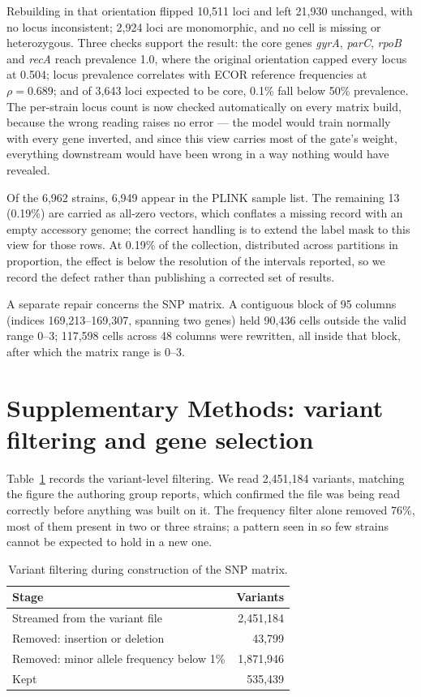 \documentclass[11pt]{article}
\begin{document}
Rebuilding in that orientation flipped 10,511 loci and left 21,930 unchanged, with no locus
inconsistent; 2,924 loci are monomorphic, and no cell is missing or heterozygous. Three checks
support the result: the core genes \textit{gyrA}, \textit{parC}, \textit{rpoB} and \textit{recA}
reach prevalence 1.0, where the original orientation capped every locus at 0.504; locus prevalence
correlates with ECOR reference frequencies at $\rho = 0.689$; and of 3,643 loci expected to be core,
0.1\% fall below 50\% prevalence. The per-strain locus count is now checked automatically on every
matrix build, because the wrong reading raises no error --- the model would train normally with
every gene inverted, and since this view carries most of the gate's weight, everything downstream
would have been wrong in a way nothing would have revealed.

Of the 6,962 strains, 6,949 appear in the PLINK sample list. The remaining 13 (0.19\%) are carried
as all-zero vectors, which conflates a missing record with an empty accessory genome; the correct
handling is to extend the label mask to this view for those rows. At 0.19\% of the collection,
distributed across partitions in proportion, the effect is below the resolution of the intervals
reported, so we record the defect rather than publishing a corrected set of results.

A separate repair concerns the SNP matrix. A contiguous block of 95 columns (indices
169,213--169,307, spanning two genes) held 90,436 cells outside the valid range 0--3; 117,598 cells
across 48 columns were rewritten, all inside that block, after which the matrix range is 0--3.

\section{Supplementary Methods: variant filtering and gene selection}

Table~\ref{tab:variants} records the variant-level filtering. We read 2,451,184 variants, matching
the figure the authoring group reports, which confirmed the file was being read correctly before
anything was built on it. The frequency filter alone removed 76\%, most of them present in two or
three strains; a pattern seen in so few strains cannot be expected to hold in a new one.

\begin{table}[t]\centering\small
\caption{Variant filtering during construction of the SNP matrix.}
\label{tab:variants}
\begin{tabular}{lr}
\toprule
Stage & Variants \\
\midrule
Streamed from the variant file & 2,451,184 \\
Removed: insertion or deletion & 43,799 \\
Removed: minor allele frequency below 1\% & 1,871,946 \\
\midrule
Kept & 535,439 \\
\bottomrule
\end{tabular}
\end{table}
\end{document}
